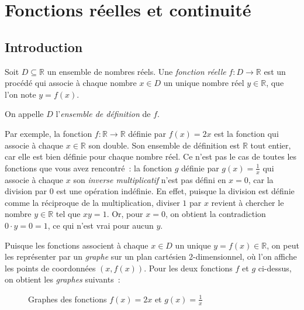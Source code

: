 \chapter{Fonctions réelles et continuité}
\section{Introduction}

\begin{boxdef}
Soit $D \subseteq \mathbb{R}$ un ensemble de nombres réels. Une \emph{fonction réelle} $f : D \to \mathbb{R}$ est un procédé qui associe à chaque nombre $x \in D$ un unique nombre réel $y \in \mathbb{R}$, que l'on note $y = f(x)$.

On appelle $D$ l'\emph{ensemble de définition} de $f$.
\end{boxdef}
Par exemple, la fonction $f : \mathbb{R} \to \mathbb{R}$ définie par $f(x) = 2x$ est la fonction qui associe à chaque $x \in \mathbb{R}$ son double. Son ensemble de définition est $\mathbb{R}$ tout entier, car elle est bien définie pour chaque nombre réel. Ce n'est pas le cas de toutes les fonctions que vous avez rencontré~: la fonction $g$ définie par $g(x) = \frac{1}{x}$ qui associe à chaque $x$ son \emph{inverse multiplicatif} n'est pas défini en $x = 0$, car la division par 0 est une opération indéfinie. En effet, puisque la division est définie comme la réciproque de la multiplication, diviser $1$ par $x$ revient à chercher le nombre $y \in \mathbb{R}$ tel que $xy = 1$. Or, pour $x = 0$, on obtient la contradiction $0\cdot y = 0 = 1$, ce qui n'est vrai pour aucun $y$.

Puisque les fonctions associent à chaque $x \in D$ un unique $y = f(x) \in \mathbb{R}$, on peut les représenter par un \emph{graphe} sur un plan cartésien 2-dimensionnel, où l'on affiche les points de coordonnées $(x, f(x))$. Pour les deux fonctions $f$ et $g$ ci-dessus, on obtient les \emph{graphes} suivants~:
\begin{figure}[H]
    \centering
    \caption{Graphes des fonctions $f(x) = 2x$ et $g(x) = \frac{1}{x}$}
    \label{fig:graph_basic_functions}
\end{figure}

